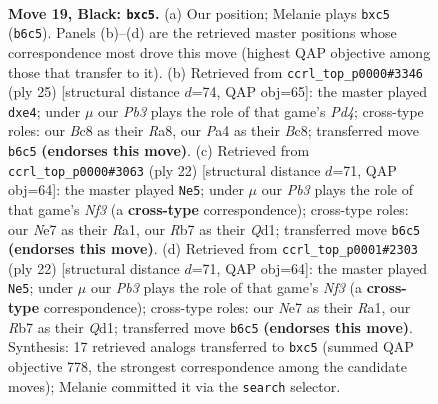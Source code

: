 \documentclass[11pt]{article}
\begin{document}
\clearpage

\begin{figure}[p]\centering
\begin{subfigure}{0.46\textwidth}\centering
\resizebox{\linewidth}{!}{%
\newchessgame
\chessboard[
  setfen={1nb1qrk1/1r2nppp/1p2p3/1NPpP3/p4P2/6K1/PPP3PP/R2Q1BNR b - - 0 19},
  showmover=false,
  pgfstyle=straightmove, color=movearrow, markmove={b6-c5}
]}
\caption{}
\end{subfigure}\hfill
\begin{subfigure}{0.46\textwidth}\centering
\resizebox{\linewidth}{!}{%
\newchessgame
\chessboard[
  setfen={r1bqr1k1/1pp2ppp/p4n2/2PpN3/4PB2/2PP3P/P4PP1/R2Q1RK1 b - - 2 13},
  showmover=false,
  pgfstyle=straightmove, color=movearrow, markmove={d5-e4}
]}
\caption{}
\end{subfigure}
\\[4pt]
\begin{subfigure}{0.46\textwidth}\centering
\resizebox{\linewidth}{!}{%
\newchessgame
\chessboard[
  setfen={rn3rk1/pp3pp1/4bq1p/2pp4/3P4/2P1PN2/P3BPPP/R2Q1RK1 w - - 3 12},
  showmover=false,
  pgfstyle=straightmove, color=movearrow, markmove={f3-e5}
]}
\caption{}
\end{subfigure}\hfill
\begin{subfigure}{0.46\textwidth}\centering
\resizebox{\linewidth}{!}{%
\newchessgame
\chessboard[
  setfen={rn3rk1/pp3pp1/4bq1p/2pp4/3P4/2P1PN2/P3BPPP/R2Q1RK1 w - - 3 12},
  showmover=false,
  pgfstyle=straightmove, color=movearrow, markmove={f3-e5}
]}
\caption{}
\end{subfigure}
\caption{\textbf{Move 19, Black: \texttt{bxc5}.} (a) Our position; Melanie plays \texttt{bxc5} (\texttt{b6c5}). Panels (b)--(d) are the retrieved master positions whose correspondence most drove this move (highest QAP objective among those that transfer to it). (b) Retrieved from \texttt{ccrl\_top\_p0000\#3346} (ply 25) [structural distance $d$=74, QAP obj=65]: the master played \texttt{dxe4}; under $\mu$ our \emph{Pb3} plays the role of that game's \emph{Pd4}; cross-type roles: our \emph{B}c8 as their \emph{R}a8, our \emph{P}a4 as their \emph{B}c8; transferred move \texttt{b6c5} \textbf{(endorses this move)}. (c) Retrieved from \texttt{ccrl\_top\_p0000\#3063} (ply 22) [structural distance $d$=71, QAP obj=64]: the master played \texttt{Ne5}; under $\mu$ our \emph{Pb3} plays the role of that game's \emph{Nf3} (a \textbf{cross-type} correspondence); cross-type roles: our \emph{N}e7 as their \emph{R}a1, our \emph{R}b7 as their \emph{Q}d1; transferred move \texttt{b6c5} \textbf{(endorses this move)}. (d) Retrieved from \texttt{ccrl\_top\_p0001\#2303} (ply 22) [structural distance $d$=71, QAP obj=64]: the master played \texttt{Ne5}; under $\mu$ our \emph{Pb3} plays the role of that game's \emph{Nf3} (a \textbf{cross-type} correspondence); cross-type roles: our \emph{N}e7 as their \emph{R}a1, our \emph{R}b7 as their \emph{Q}d1; transferred move \texttt{b6c5} \textbf{(endorses this move)}. Synthesis: 17 retrieved analogs transferred to \texttt{bxc5} (summed QAP objective 778, the strongest correspondence among the candidate moves); Melanie committed it via the \texttt{search} selector.}
\label{fig:thought-m37}
\end{figure}
\end{document}
